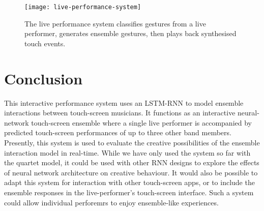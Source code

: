 \documentclass[sigchi-a, authorversion]{acmart}
\begin{document}
\begin{figure}
  \centering
  \texttt{[image: live-performance-system]}
  \caption{The live performance system classifies gestures from a live
  performer, generates ensemble gestures, then plays back synthesised
  touch events.}\label{fig:live-performance-system}
\end{figure}

\section{Conclusion}

This interactive performance system uses an LSTM-RNN to model ensemble
interactions between touch-screen musicians. It functions as an
interactive neural-network touch-screen ensemble where a single live
performer is accompanied by predicted touch-screen performances of up
to three other band members. Presently, this system is used to
evaluate the creative possibilities of the ensemble interaction model
in real-time. While we have only used the system so far with the
quartet model, it could be used with other RNN designs to explore the
effects of neural network architecture on creative behaviour. It would
also be possible to adapt this system for interaction with other
touch-screen apps, or to include the ensemble responses in the
live-performer's touch-screen interface. Such a system could allow
individual perforemrs to enjoy ensemble-like experiences.



\end{document}
